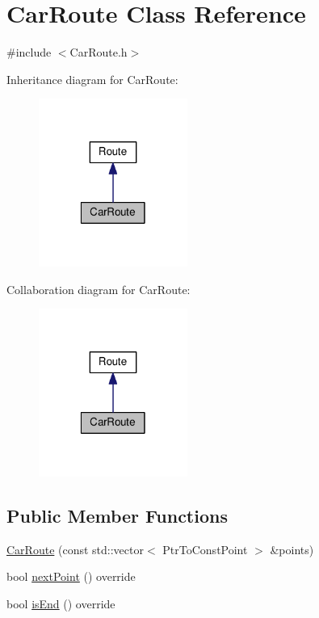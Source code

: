 \hypertarget{classCarRoute}{\section{Car\-Route Class Reference}
\label{classCarRoute}
}


{\ttfamily \#include $<$Car\-Route.\-h$>$}



Inheritance diagram for Car\-Route\-:
\nopagebreak
\begin{figure}[H]
\begin{center}
\leavevmode
\includegraphics[width=138pt]{classCarRoute__inherit__graph}
\end{center}
\end{figure}


Collaboration diagram for Car\-Route\-:
\nopagebreak
\begin{figure}[H]
\begin{center}
\leavevmode
\includegraphics[width=138pt]{classCarRoute__coll__graph}
\end{center}
\end{figure}
\subsection*{Public Member Functions}
\begin{DoxyCompactItemize}
\item 
\hyperlink{classCarRoute_aa2fb96df759188781a2b534b533cf62b}{Car\-Route} (const std\-::vector$<$ Ptr\-To\-Const\-Point $>$ \&points)
\item 
bool \hyperlink{classCarRoute_a48a60e9054bcb3b775f4a56b50c0d79d}{next\-Point} () override
\item 
bool \hyperlink{classCarRoute_a4d8589aeb5b9accd189756dda8b618c6}{is\-End} () override
\end{DoxyCompactItemize}


